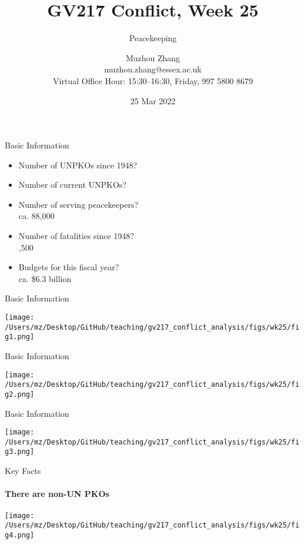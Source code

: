 \documentclass{beamer}
\title{GV217 Conflict, Week 25}
\subtitle{Peacekeeping}
\author{Muzhou Zhang\\ muzhou.zhang@essex.ac.uk\\ Virtual Office Hour: 15:30--16:30, Friday, 997 5800 8679}
\date{25 Mar 2022}
\begin{document}
\maketitle
{}

\begin{frame}{Basic Information}
    \begin{itemize}
        \pause\item Number of UNPKOs since 1948?\\
        \pause\item Number of current UNPKOs?\\
        \pause\item Number of serving peacekeepers?\\
        \pause      ca. 88,000
        \pause\item Number of fatalities since 1948?\\
        ,500
        \pause\item Budgets for this fiscal year?\\
        \pause      ca. \$6.3 billion
    \end{itemize}
\end{frame}

\begin{frame}{Basic Information}
    \pause
    \begin{center}
        \texttt{[image: /Users/mz/Desktop/GitHub/teaching/gv217\_conflict\_analysis/figs/wk25/fig1.png]}
    \end{center}
\end{frame}

\begin{frame}{Basic Information}
    \pause
    \begin{center}
        \texttt{[image: /Users/mz/Desktop/GitHub/teaching/gv217\_conflict\_analysis/figs/wk25/fig2.png]}
    \end{center}
\end{frame}

\begin{frame}{Basic Information}
    \pause
    \begin{center}
        \texttt{[image: /Users/mz/Desktop/GitHub/teaching/gv217\_conflict\_analysis/figs/wk25/fig3.png]}
    \end{center}
\end{frame}

\begin{frame}{Key Facts}
\framesubtitle{There are non-UN PKOs}
    \pause
    \begin{center}
        \texttt{[image: /Users/mz/Desktop/GitHub/teaching/gv217\_conflict\_analysis/figs/wk25/fig4.png]}
    \end{center}
\end{frame}
\end{document}
